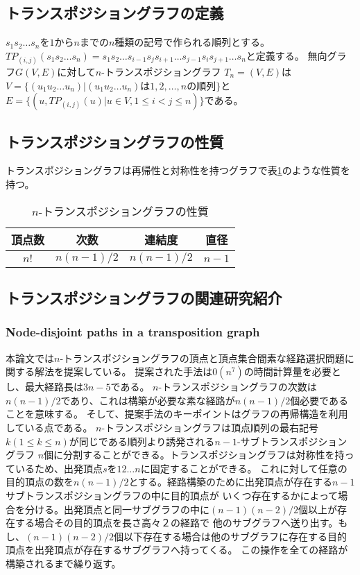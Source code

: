 \documentclass[11pt,a4j]{jsarticle}
\theoremstyle{plain}
\begin{document}
\subsection{トランスポジショングラフの定義}
$s_1s_2\dots s_n$を$1$から$n$までの$n$種類の記号で作られる順列とする。$TP_{(i,j)}(s_1s_2\dots s_n)=s_1s_2\dots s_{i-1}s_{j}s_{i+1}\dots s_{j-1}s_{i}s_{j+1}\dots s_n$と定義する。
無向グラフ$G(V,E)$に対して$n$-トランスポジショングラフ $T_n=(V,E)$は$V=\{(u_1u_2\dots u_n)|(u_1u_2\dots u_n)は1,2,\dots ,nの順列\}$と$E=\{(u,TP_{(i,j)}(u) | u \in V, 1 \leq i < j \leq n)\}$である。


\subsection{トランスポジショングラフの性質}
トランスポジショングラフは再帰性と対称性を持つグラフで表\ref{tab:tn_prop}のような性質を持つ。

\begin{table}[htb]
  \begin{center}
    \caption{$n$-トランスポジショングラフの性質}
    \begin{tabular}{|c|c|c|c|} \hline
      頂点数&次数&連結度&直径 \\ \hline 
      $n!$ & $n(n-1)/2$&$n(n-1)/2$& $n-1$\\ \hline
    \end{tabular}
        \label{tab:tn_prop}
  \end{center}
\end{table}

\subsection{トランスポジショングラフの関連研究紹介}
\subsubsection{Node-disjoint paths in a transposition graph}
本論文\cite{tp-n2s}では$n$-トランスポジショングラフの頂点と頂点集合間素な経路選択問題に関する解法を提案している。
提案された手法は$0(n^7)$の時間計算量を必要とし、最大経路長は$3n-5$である。\newline
$n$-トランスポジショングラフの次数は$n(n-1)/2$であり、これは構築が必要な素な経路が$n(n-1)/2$個必要であることを意味する。
そして、提案手法のキーポイントはグラフの再帰構造を利用している点である。
$n$-トランスポジショングラフは頂点順列の最右記号$k( 1 \leq k \leq n )$が同じである順列より誘発される$n-1$-サブトランスポジショングラフ
$n$個に分割することができる。トランスポジショングラフは対称性を持っているため、出発頂点$s$を$12\dots n$に固定することができる。
これに対して任意の目的頂点の数を$n(n-1)/2$とする。経路構築のために出発頂点が存在する$n-1$サブトランスポジショングラフの中に目的頂点が
いくつ存在するかによって場合を分ける。出発頂点と同一サブグラフの中に$(n-1)(n-2)/2$個以上が存在する場合その目的頂点を長さ高々２の経路で
他のサブグラフへ送り出す。もし、$(n-1)(n-2)/2$個以下存在する場合は他のサブグラフに存在する目的頂点を出発頂点が存在するサブグラフへ持ってくる。
この操作を全ての経路が構築されるまで繰り返す。
\end{document}
